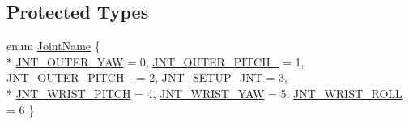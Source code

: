 \subsection*{Protected Types}
\begin{DoxyCompactItemize}
\item 
enum \hyperlink{classmts_intuitive_research_kit_m_t_m_a76e15ff0552b14b45abb0aaa26cb122d}{Joint\-Name} \{ \\*
\hyperlink{classmts_intuitive_research_kit_m_t_m_a76e15ff0552b14b45abb0aaa26cb122dade63397203b20655849d9a523e4aac43}{J\-N\-T\-\_\-\-O\-U\-T\-E\-R\-\_\-\-Y\-A\-W} = 0, 
\hyperlink{classmts_intuitive_research_kit_m_t_m_a76e15ff0552b14b45abb0aaa26cb122da51b3f647a65a660717fc7a394f62447b}{J\-N\-T\-\_\-\-O\-U\-T\-E\-R\-\_\-\-P\-I\-T\-C\-H\-\_} = 1, 
\hyperlink{classmts_intuitive_research_kit_m_t_m_a76e15ff0552b14b45abb0aaa26cb122da3c8b9bb2448a09024a9aecbbe56723d8}{J\-N\-T\-\_\-\-O\-U\-T\-E\-R\-\_\-\-P\-I\-T\-C\-H\-\_} = 2, 
\hyperlink{classmts_intuitive_research_kit_m_t_m_a76e15ff0552b14b45abb0aaa26cb122daf6c47398b783f389c2f0ba1dae4555bc}{J\-N\-T\-\_\-\-S\-E\-T\-U\-P\-\_\-\-J\-N\-T} = 3, 
\\*
\hyperlink{classmts_intuitive_research_kit_m_t_m_a76e15ff0552b14b45abb0aaa26cb122da13633ee4dc909b62f70a0d8fd9100b03}{J\-N\-T\-\_\-\-W\-R\-I\-S\-T\-\_\-\-P\-I\-T\-C\-H} = 4, 
\hyperlink{classmts_intuitive_research_kit_m_t_m_a76e15ff0552b14b45abb0aaa26cb122dabb6190cb73f32fd6383d6bd7c1dd7caa}{J\-N\-T\-\_\-\-W\-R\-I\-S\-T\-\_\-\-Y\-A\-W} = 5, 
\hyperlink{classmts_intuitive_research_kit_m_t_m_a76e15ff0552b14b45abb0aaa26cb122daf556c23d62e223b033adc4ee32718a95}{J\-N\-T\-\_\-\-W\-R\-I\-S\-T\-\_\-\-R\-O\-L\-L} = 6
 \}
\end{DoxyCompactItemize}
